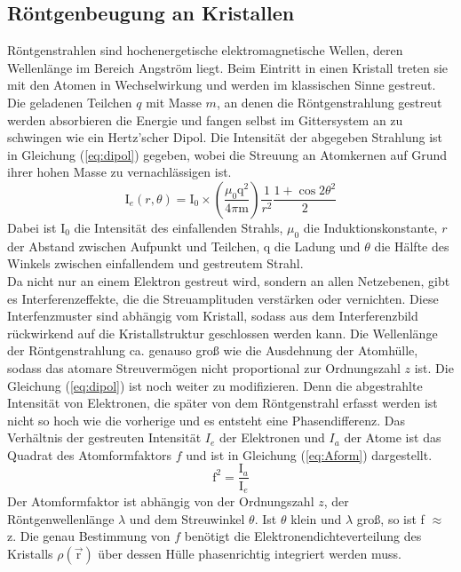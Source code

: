 \subsection{Röntgenbeugung an Kristallen}
Röntgenstrahlen sind hochenergetische elektromagnetische Wellen, deren Wellenlänge im Bereich Angström liegt. 
Beim Eintritt in einen Kristall treten sie mit den Atomen in Wechselwirkung und werden im klassischen Sinne gestreut.
Die geladenen Teilchen $q$ mit Masse $m$, an denen die Röntgenstrahlung gestreut werden absorbieren die Energie und fangen selbst im Gittersystem an zu schwingen wie ein Hertz'scher Dipol.
Die Intensität der abgegeben Strahlung ist in Gleichung (\ref{eq:dipol}) gegeben, wobei die Streuung an Atomkernen auf Grund ihrer hohen Masse zu vernachlässigen ist.
\begin{equation}
\text{I}_e(r,\theta) = \text{I}_0\times \left(\frac{\mu_0 \text{q}^2}{4 \pi \text{m}}\right) \frac{1}{r^2} \frac{1+\cos{2\theta}^2}{2}
\label{eq:dipol}
\end{equation}
Dabei ist I$_0$ die Intensität des einfallenden Strahls, $\mu_0$ die Induktionskonstante, $r$ der Abstand zwischen Aufpunkt und Teilchen, q die Ladung und $\theta$ die Hälfte des Winkels zwischen einfallendem und gestreutem Strahl.\\
Da nicht nur an einem Elektron gestreut wird, sondern an allen Netzebenen, gibt es Interferenzeffekte, die die Streuamplituden verstärken oder vernichten.
Diese Interfenzmuster sind abhängig vom Kristall, sodass aus dem Interferenzbild rückwirkend auf die Kristallstruktur geschlossen werden kann.
Die Wellenlänge der Röntgenstrahlung ca. genauso groß wie die Ausdehnung der Atomhülle, sodass das atomare Streuvermögen nicht proportional zur Ordnungszahl $z$ ist.
Die Gleichung (\ref{eq:dipol}) ist noch weiter zu modifizieren.
Denn die abgestrahlte Intensität von Elektronen, die später von dem Röntgenstrahl erfasst werden ist nicht so hoch wie die vorherige und es entsteht eine Phasendifferenz.
Das Verhältnis der gestreuten Intensität $I_e$ der Elektronen und $I_a$ der Atome ist das Quadrat des Atomformfaktors $f$ und ist in Gleichung (\ref{eq:Aform}) dargestellt.
\begin{equation}
\text{f}^2 = \frac{\text{I}_a}{\text{I}_e}
\label{eq:Aform}
\end{equation}
Der Atomformfaktor ist abhängig von der Ordnungszahl $z$, der Röntgenwellenlänge $\lambda$ und dem Streuwinkel $\theta$. 
Ist $\theta$ klein und $\lambda$ groß, so ist f $\approx$ z.
Die genau Bestimmung von $f$ benötigt die Elektronendichteverteilung des Kristalls $\rho(\vec{\text{r}})$ über dessen Hülle phasenrichtig integriert werden muss.\\
